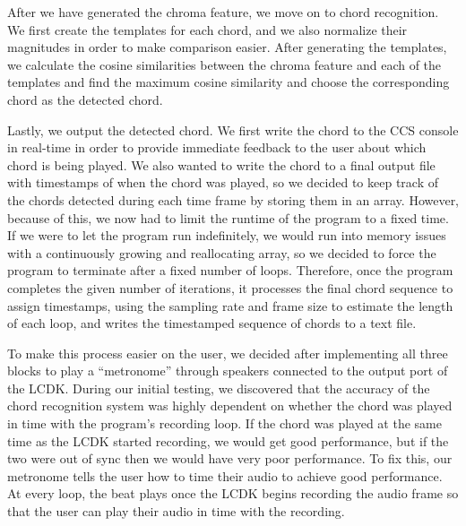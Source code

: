 \documentclass[journal]{IEEEtran}
\begin{document}
After we have generated the chroma feature, we move on to chord recognition.
We first create the templates for each chord, and we also normalize their magnitudes in order to make comparison easier.
After generating the templates, we calculate the cosine similarities between the chroma feature and each of the templates and find the maximum cosine similarity and choose the corresponding chord as the detected chord.

Lastly, we output the detected chord.
We first write the chord to the CCS console in real-time in order to provide immediate feedback to the user about which chord is being played.
We also wanted to write the chord to a final output file with timestamps of when the chord was played, so we decided to keep track of the chords detected during each time frame by storing them in an array.
However, because of this, we now had to limit the runtime of the program to a fixed time.
If we were to let the program run indefinitely, we would run into memory issues with a continuously growing and reallocating array, so we decided to force the program to terminate after a fixed number of loops.
Therefore, once the program completes the given number of iterations, it processes the final chord sequence to assign timestamps, using the sampling rate and frame size to estimate the length of each loop, and writes the timestamped sequence of chords to a text file.

To make this process easier on the user, we decided after implementing all three blocks to play a ``metronome'' through speakers connected to the output port of the LCDK.
During our initial testing, we discovered that the accuracy of the chord recognition system was highly dependent on whether the chord was played in time with the program's recording loop.
If the chord was played at the same time as the LCDK started recording, we would get good performance, but if the two were out of sync then we would have very poor performance.
To fix this, our metronome tells the user how to time their audio to achieve good performance.
At every loop, the beat plays once the LCDK begins recording the audio frame so that the user can play their audio in time with the recording.
\end{document}
